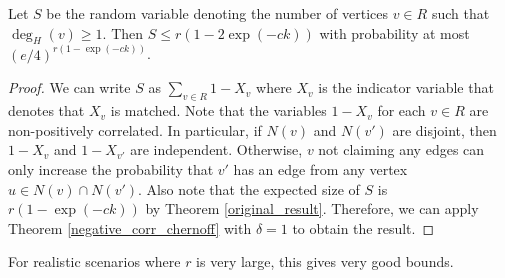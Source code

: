 
\begin{thm}
Let $S$ be the random variable denoting the number of vertices $v \in R$ such that $\deg_{H}(v)\geq 1$. Then
$ S \leq r(1-2\exp(-ck))$ with probability at most $(e/4)^{r(1-\exp(-ck))}$.
\end{thm}

\begin{proof}
We can write $S$ as $\sum_{v\in R} 1-X_v$ where $X_v$ is the indicator
variable that denotes that $X_v$ is matched. Note that the variables
$1-X_v$ for each $v\in R$ are non-positively correlated. In
particular, if $N(v)$ and $N(v')$ are disjoint, then $1-X_v$ and
$1-X_{v'}$ are independent. Otherwise, $v$ not claiming any edges can
only increase the probability that $v'$ has an edge from any vertex
$u\in N(v)\cap N(v')$. Also note that the expected size of $S$ is
$r(1-\exp(-ck))$ by Theorem \ref{original_result}. Therefore, we can
apply Theorem \ref{negative_corr_chernoff} with $\delta=1$ to obtain
the result.
\end{proof}
For realistic scenarios where $r$ is very large, this gives very good bounds. 